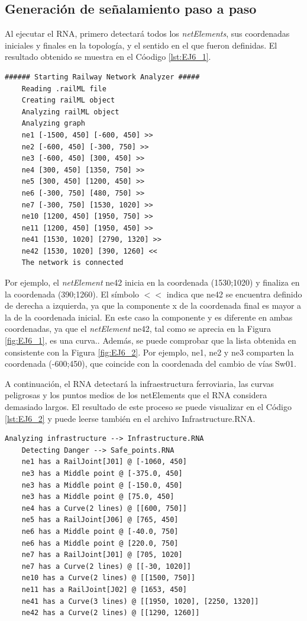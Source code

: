 \subsection{Generación de señalamiento paso a paso}

	Al ejecutar el RNA, primero detectará todos los \textit{netElements}, sus coordenadas iniciales y finales en la topología, y el sentido en el que fueron definidas. El resultado obtenido se muestra en el Cóodigo \ref{lst:EJ6_1}.
	
	\begin{lstlisting}[language = {}, caption = Detección de \textit{netElements} por parte del RNA , label = {lst:EJ6_1}]
	###### Starting Railway Network Analyzer #####
	Reading .railML file
	Creating railML object
	Analyzing railML object
	Analyzing graph
	ne1 [-1500, 450] [-600, 450] >>
	ne2 [-600, 450] [-300, 750] >> 
	ne3 [-600, 450] [300, 450] >>
	ne4 [300, 450] [1350, 750] >>
	ne5 [300, 450] [1200, 450] >>
	ne6 [-300, 750] [480, 750] >>
	ne7 [-300, 750] [1530, 1020] >>
	ne10 [1200, 450] [1950, 750] >>
	ne11 [1200, 450] [1950, 450] >>
	ne41 [1530, 1020] [2790, 1320] >>
	ne42 [1530, 1020] [390, 1260] <<
	The network is connected
	\end{lstlisting}
	
	Por ejemplo, el \textit{netElement} ne42 inicia en la coordenada (1530;1020) y finaliza en la coordenada (390;1260). El símbolo $<<$ indica que ne42 se encuentra definido de derecha a izquierda, ya que la componente x de la coordenada final es mayor a la de la coordenada inicial. En este caso la componente y es diferente en ambas coordenadas, ya que el \textit{netElement} ne42, tal como se aprecia en la Figura \ref{fig:EJ6_1}, es una curva.. Además, se puede comprobar que la lista obtenida en consistente con la Figura \ref{fig:EJ6_2}. Por ejemplo, ne1, ne2 y ne3 comparten la coordenada (-600;450), que coincide con la coordenada del cambio de vías Sw01.
	
	A continuación, el RNA detectará la infraestructura ferroviaria, las curvas peligrosas y los puntos medios de los netElements que el RNA considera demasiado largos. El resultado de este proceso se puede visualizar en el Código \ref{lst:EJ6_2} y puede leerse también en el archivo Infrastructure.RNA.
	
	\begin{lstlisting}[language = {}, caption = Detección de puntos críticos por parte del RNA , label = {lst:EJ6_2}]
	Analyzing infrastructure --> Infrastructure.RNA
	Detecting Danger --> Safe_points.RNA
	ne1 has a RailJoint[J01] @ [-1060, 450]
	ne3 has a Middle point @ [-375.0, 450]
	ne3 has a Middle point @ [-150.0, 450]
	ne3 has a Middle point @ [75.0, 450]
	ne4 has a Curve(2 lines) @ [[600, 750]]
	ne5 has a RailJoint[J06] @ [765, 450]
	ne6 has a Middle point @ [-40.0, 750]
	ne6 has a Middle point @ [220.0, 750]
	ne7 has a RailJoint[J01] @ [705, 1020]
	ne7 has a Curve(2 lines) @ [[-30, 1020]]
	ne10 has a Curve(2 lines) @ [[1500, 750]]
	ne11 has a RailJoint[J02] @ [1653, 450]
	ne41 has a Curve(3 lines) @ [[1950, 1020], [2250, 1320]]
	ne42 has a Curve(2 lines) @ [[1290, 1260]]
	\end{lstlisting}
	

